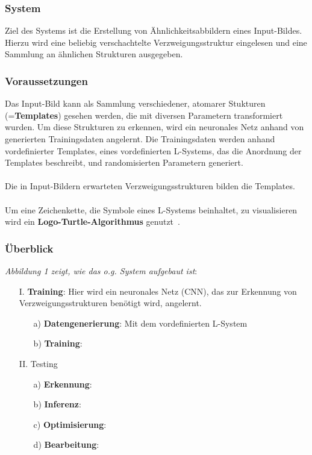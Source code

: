 \documentclass[11pt]{article}
\begin{document}
    \subsubsection{System}
    Ziel des Systems ist die Erstellung von Ähnlichkeitsabbildern eines Input-Bildes.
    Hierzu wird eine beliebig verschachtelte Verzweigungsstruktur eingelesen und eine Sammlung an ähnlichen Strukturen
    ausgegeben.

    \subsubsection{Voraussetzungen}
    Das Input-Bild kann als Sammlung verschiedener, atomarer Stukturen (=\textbf{Templates}) gesehen werden, die mit
    diversen Parametern transformiert wurden.
    Um diese Strukturen zu erkennen, wird ein neuronales Netz anhand von generierten Trainingsdaten angelernt.
    Die Trainingsdaten werden anhand vordefinierter Templates, eines vordefinierten L-Systems, das die Anordnung
    der Templates beschreibt, und randomisierten Parametern generiert.\\~\\
    Die in Input-Bildern erwarteten Verzweigungsstrukturen bilden die Templates.\\~\\
    Um eine Zeichenkette, die Symbole eines L-Systems beinhaltet, zu visualisieren wird ein \textbf{Logo-Turtle-Algorithmus}
    genutzt~\cite{3}.

    \subsubsection{Überblick}
    \textit{Abbildung 1 zeigt, wie das o.g. System aufgebaut ist}:
    \begin{itemize}
        \item[I.] \textbf{Training}: Hier wird ein neuronales Netz (CNN), das zur Erkennung von
        Verzweigungsstrukturen benötigt wird, angelernt.
        \begin{itemize}
            \item[a)] \textbf{Datengenerierung}: Mit dem vordefinierten L-System
            \item[b)] \textbf{Training}:
        \end{itemize}
        \item[II.] Testing
        \begin{itemize}
            \item[a)] \textbf{Erkennung}:
            \item[b)] \textbf{Inferenz}:
            \item[c)] \textbf{Optimisierung}:
            \item[d)] \textbf{Bearbeitung}:
        \end{itemize}
    \end{itemize}
\end{document}
